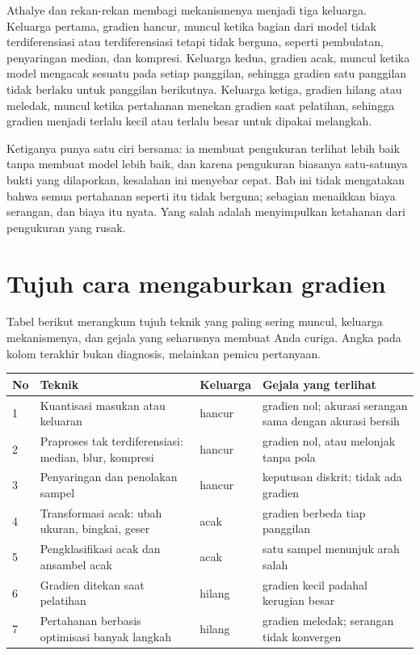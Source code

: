 Athalye dan rekan-rekan membagi mekanismenya menjadi tiga keluarga. Keluarga pertama,
gradien hancur, muncul ketika bagian dari model tidak terdiferensiasi atau
terdiferensiasi tetapi tidak berguna, seperti pembulatan, penyaringan median, dan
kompresi. Keluarga kedua, gradien acak, muncul ketika model mengacak sesuatu pada setiap
panggilan, sehingga gradien satu panggilan tidak berlaku untuk panggilan berikutnya.
Keluarga ketiga, gradien hilang atau meledak, muncul ketika pertahanan menekan gradien
saat pelatihan, sehingga gradien menjadi terlalu kecil atau terlalu besar untuk dipakai
melangkah.

Ketiganya punya satu ciri bersama: ia membuat pengukuran terlihat lebih baik tanpa
membuat model lebih baik, dan karena pengukuran biasanya satu-satunya bukti yang
dilaporkan, kesalahan ini menyebar cepat. Bab ini tidak mengatakan bahwa semua pertahanan
seperti itu tidak berguna; sebagian menaikkan biaya serangan, dan biaya itu nyata. Yang
salah adalah menyimpulkan ketahanan dari pengukuran yang rusak.

\section{Tujuh cara mengaburkan gradien}

Tabel berikut merangkum tujuh teknik yang paling sering muncul, keluarga mekanismenya,
dan gejala yang seharusnya membuat Anda curiga. Angka pada kolom terakhir bukan
diagnosis, melainkan pemicu pertanyaan.

\begin{center}
\small
\begin{tabular}{@{}p{0.6cm}p{4.6cm}p{2.1cm}p{6.4cm}@{}}
\hline
No & Teknik & Keluarga & Gejala yang terlihat \\
\hline
1 & Kuantisasi masukan atau keluaran & hancur & gradien nol; akurasi serangan sama dengan akurasi bersih \\
2 & Praproses tak terdiferensiasi: median, blur, kompresi & hancur & gradien nol, atau melonjak tanpa pola \\
3 & Penyaringan dan penolakan sampel & hancur & keputusan diskrit; tidak ada gradien \\
4 & Transformasi acak: ubah ukuran, bingkai, geser & acak & gradien berbeda tiap panggilan \\
5 & Pengklasifikasi acak dan ansambel acak & acak & satu sampel menunjuk arah salah \\
6 & Gradien ditekan saat pelatihan & hilang & gradien kecil padahal kerugian besar \\
7 & Pertahanan berbasis optimisasi banyak langkah & hilang & gradien meledak; serangan tidak konvergen \\
\hline
\end{tabular}
\end{center}

